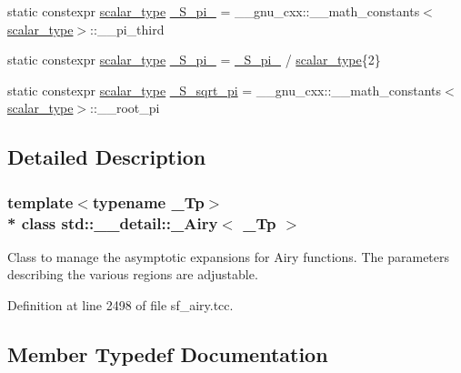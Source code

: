 \begin{DoxyCompactItemize}
\item 
static constexpr \hyperlink{classstd_1_1____detail_1_1__Airy_a266cdfcc86b36c8743fd0e102387e1f0}{scalar\+\_\+type} \hyperlink{classstd_1_1____detail_1_1__Airy_a2050b1922ed0b79c5231ada9dffc77e5}{\+\_\+\+S\+\_\+pi\+\_} = \+\_\+\+\_\+gnu\+\_\+cxx\+::\+\_\+\+\_\+math\+\_\+constants$<$\hyperlink{classstd_1_1____detail_1_1__Airy_a266cdfcc86b36c8743fd0e102387e1f0}{scalar\+\_\+type}$>$\+::\+\_\+\+\_\+pi\+\_\+third
\item 
static constexpr \hyperlink{classstd_1_1____detail_1_1__Airy_a266cdfcc86b36c8743fd0e102387e1f0}{scalar\+\_\+type} \hyperlink{classstd_1_1____detail_1_1__Airy_ab43a77e34022fb3e772ef6504bf9319e}{\+\_\+\+S\+\_\+pi\+\_} = \hyperlink{classstd_1_1____detail_1_1__Airy_a2050b1922ed0b79c5231ada9dffc77e5}{\+\_\+\+S\+\_\+pi\+\_} / \hyperlink{classstd_1_1____detail_1_1__Airy_a266cdfcc86b36c8743fd0e102387e1f0}{scalar\+\_\+type}\{2\}
\item 
static constexpr \hyperlink{classstd_1_1____detail_1_1__Airy_a266cdfcc86b36c8743fd0e102387e1f0}{scalar\+\_\+type} \hyperlink{classstd_1_1____detail_1_1__Airy_abee18aba33b66386e818da9c7f4eeff4}{\+\_\+\+S\+\_\+sqrt\+\_\+pi} = \+\_\+\+\_\+gnu\+\_\+cxx\+::\+\_\+\+\_\+math\+\_\+constants$<$\hyperlink{classstd_1_1____detail_1_1__Airy_a266cdfcc86b36c8743fd0e102387e1f0}{scalar\+\_\+type}$>$\+::\+\_\+\+\_\+root\+\_\+pi
\end{DoxyCompactItemize}


\subsection{Detailed Description}
\subsubsection*{template$<$typename \+\_\+\+Tp$>$\\*
class std\+::\+\_\+\+\_\+detail\+::\+\_\+\+Airy$<$ \+\_\+\+Tp $>$}

Class to manage the asymptotic expansions for Airy functions. The parameters describing the various regions are adjustable. 

Definition at line 2498 of file sf\+\_\+airy.\+tcc.



\subsection{Member Typedef Documentation}
